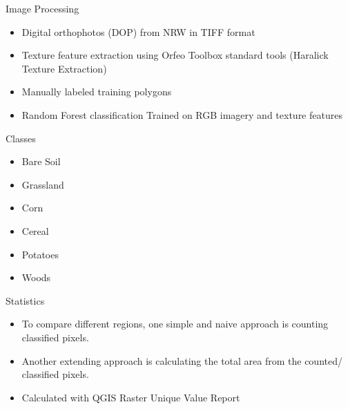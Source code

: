 \documentclass[
  t,%
]{_style/tudelft-beamerposter}
\begin{document}
\begin{frame}
\begin{columns}[onlytextwidth, T]
\begin{column}{}
      \begin{block}{Image Processing}
        \begin{itemize}
          \item Digital orthophotos (DOP) from NRW in TIFF format
          \item Texture feature extraction using Orfeo Toolbox standard tools (Haralick Texture Extraction)
          \item Manually labeled training polygons
          \item Random Forest classification
          \SubItem Trained on RGB imagery and texture features \cite{rs70101074}
        \end{itemize}
      \end{block}

      \begin{multicols}{2}
        \begin{block}{Classes}
          \begin{itemize}
            \item Bare Soil
            \item Grassland
            \item Corn
            \item Cereal
            \item Potatoes
            \item Woods
          \end{itemize}
          \vspace{1.25cm}
        \end{block}

        \begin{block}{Statistics}
            \begin{itemize}
                \item To compare different regions, one simple and naive approach is counting classified pixels. 
                \item Another extending approach is calculating the total area from the counted/ classified pixels.
                \item Calculated with QGIS Raster Unique Value Report
            \end{itemize}
        \end{block}
      \end{multicols}


\end{column}
\end{columns}
\end{frame}
\end{document}
